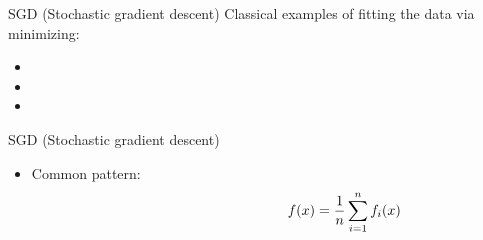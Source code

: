 \documentclass[fleqn]{beamer}
\begin{document}
    \begin{frame}{SGD (Stochastic gradient descent)}
        Classical examples of fitting the data via minimizing:
        \begin{itemize}
            \item \mbox{}
            \item \mbox{}
        \item \mbox{}

        \end{itemize}
    \end{frame}

    \begin{frame}{SGD (Stochastic gradient descent)}
        \begin{itemize}
            \item Common pattern:
                \begin{align*}
                    \hspace{0.3\linewidth}
                    f(x) = \frac{1}{n} \sum_{i=1}^{n} f_i(x)
                \end{align*}
        \end{itemize}
    \end{frame}
\end{document}

